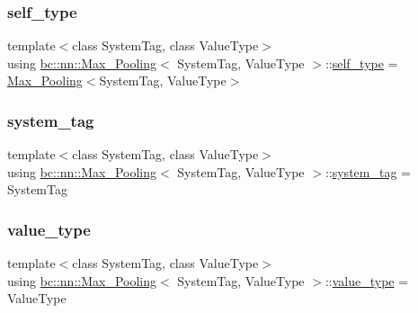 \subsubsection{\texorpdfstring{self\+\_\+type}{self\_type}}
{\footnotesize\ttfamily template$<$class System\+Tag, class Value\+Type$>$ \\
using \hyperlink{structbc_1_1nn_1_1Max__Pooling}{bc\+::nn\+::\+Max\+\_\+\+Pooling}$<$ System\+Tag, Value\+Type $>$\+::\hyperlink{structbc_1_1nn_1_1Max__Pooling_a4cec43dcbb377793bea061155fbbca52}{self\+\_\+type} =  \hyperlink{structbc_1_1nn_1_1Max__Pooling}{Max\+\_\+\+Pooling}$<$System\+Tag, Value\+Type$>$}

\mbox{\label{structbc_1_1nn_1_1Max__Pooling_a8051bc815bee4d25c7506dbe870b4fca}} 
\subsubsection{\texorpdfstring{system\+\_\+tag}{system\_tag}}
{\footnotesize\ttfamily template$<$class System\+Tag, class Value\+Type$>$ \\
using \hyperlink{structbc_1_1nn_1_1Max__Pooling}{bc\+::nn\+::\+Max\+\_\+\+Pooling}$<$ System\+Tag, Value\+Type $>$\+::\hyperlink{structbc_1_1nn_1_1Max__Pooling_a8051bc815bee4d25c7506dbe870b4fca}{system\+\_\+tag} =  System\+Tag}

\mbox{\label{structbc_1_1nn_1_1Max__Pooling_ab25ed5aac84aa22b0278f2b9ece6a163}} 
\subsubsection{\texorpdfstring{value\+\_\+type}{value\_type}}
{\footnotesize\ttfamily template$<$class System\+Tag, class Value\+Type$>$ \\
using \hyperlink{structbc_1_1nn_1_1Max__Pooling}{bc\+::nn\+::\+Max\+\_\+\+Pooling}$<$ System\+Tag, Value\+Type $>$\+::\hyperlink{structbc_1_1nn_1_1Max__Pooling_ab25ed5aac84aa22b0278f2b9ece6a163}{value\+\_\+type} =  Value\+Type}



